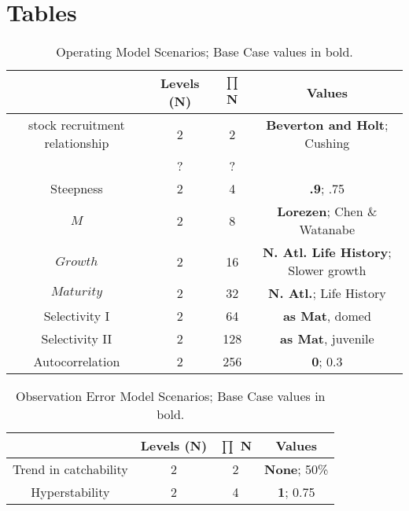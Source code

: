 \documentclass[%
nonumbib,      %
%
]{nrc1}                          %
\begin{document}
\section*{Tables}
\begin{table}
\label{tab:grid}
\caption{Operating Model Scenarios; Base Case values in bold.}  
\begin{center}
\label{tab:datasumm}
\begin{tabular}{|cccc|}
\hline
			& {\tiny Levels (N)} & {\tiny $\prod$ N} & {\tiny Values} \\ %
\hline\hline
{\tiny stock recruitment relationship} 	 & {\tiny 2} 	 & {\tiny   2}  & {\tiny  \textbf{Beverton and Holt}; Cushing}     \\                  & {\tiny ?}    & {\tiny ?}\\
{\tiny Steepness}	                 & {\tiny 2} 	 & {\tiny   4}  & {\tiny  \textbf{.9}; .75}                             \\
{\tiny $M$} 		                 & {\tiny 2} 	 & {\tiny   8}  & {\tiny  \textbf{Lorezen}; Chen \& Watanabe} 	        \\
{\tiny $Growth$} 	                 & {\tiny 2} 	 & {\tiny  16}  & {\tiny  \textbf{N. Atl. Life History}; Slower growth} \\
{\tiny $Maturity$} 	                 & {\tiny 2} 	 & {\tiny  32}  & {\tiny  \textbf{N. Atl.}; Life History}               \\
{\tiny Selectivity I}	                 & {\tiny 2} 	 & {\tiny  64}  & {\tiny  \textbf{as Mat}, domed}      		        \\
{\tiny Selectivity II}	                 & {\tiny 2} 	 & {\tiny 128}  & {\tiny  \textbf{as Mat}, juvenile}   		        \\
{\tiny Autocorrelation}	                 & {\tiny 2} 	 & {\tiny 256}  & {\tiny  \textbf{0}; 0.3}                              \\

\hline
\end{tabular}
\end{center}
\end{table}


\begin{table}
\label{tab:oem}
\caption{Observation Error Model Scenarios; Base Case values in bold.}  
\begin{center}
\label{tab:datasumm}
\begin{tabular}{|cccc|}
\hline
			& {\tiny Levels (N)} & {\tiny $\prod$ N} & {\tiny Values} \\ 
\hline\hline
{\tiny Trend in catchability } & {\tiny 2} 	 & {\tiny   2}  & {\tiny  \textbf{None}; 50\%}   \\
{\tiny Hyperstability}	       & {\tiny 2} 	 & {\tiny   4}  & {\tiny  \textbf{1}; 0.75}     \\
\hline
\end{tabular}
\end{center}
\end{table}
\end{document}
